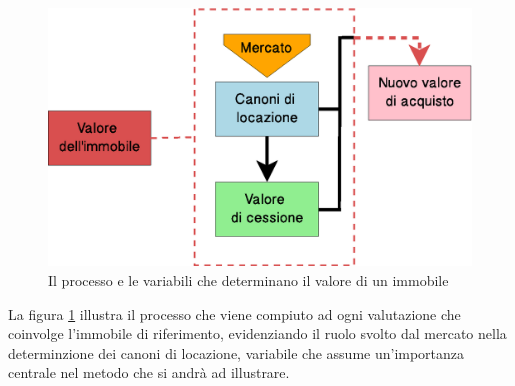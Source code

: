\begin{figure}[htbp]
\includegraphics[scale=1]{Immagini/valoreimmobile.eps}
\caption[Sintesi della determinazione del valore di un immobile]{Il processo e le variabili che determinano il valore di un immobile}
\label{fig:valoreimmobile}
\end{figure} 

La figura \ref{fig:valoreimmobile} illustra il processo che viene compiuto ad ogni valutazione che coinvolge l'immobile di riferimento, evidenziando il ruolo svolto dal mercato nella determinzione dei canoni di locazione, variabile che assume un'importanza centrale nel metodo che si andrà ad illustrare.

